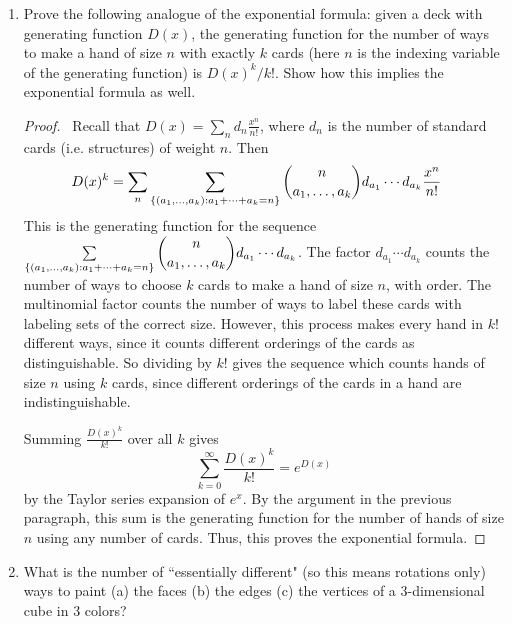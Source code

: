 \documentclass[12pt]{article}
\begin{document}
\begin{enumerate}[leftmargin=0cm,itemindent=.5cm,labelwidth=\itemindent,labelsep=0cm,align=left]
\begin{proof}
Therefore, this process gives a bijection from the set of imperfect matchings on $C_{2n}$, of which there are $L_{2n} - 2$, to the set of subtrees of $W_n$.

\end{proof}

\item Prove the following analogue of the exponential formula: given a deck with generating function $D(x)$, the generating function for the number of ways to make a hand of size $n$ with exactly $k$ cards (here $n$ is the indexing variable of the generating function) is $D(x)^k / k!$.  Show how this implies the exponential formula as well.

\begin{proof}
\ Recall that $D(x) = \sum\limits_n d_n \frac{x^n}{n!}$, where $d_n$ is the number of standard cards (i.e. structures) of weight $n$.  Then
\begin{align*}
D(x)^k &= \sum\limits_n \sum\limits_{\{(a_1, \dots , a_k) : a_1 + \cdots + a_k = n \}} \dbinom{n}{a_1, \dots , a_k}d_{a_1} \cdots d_{a_k} \frac{x^n}{n!}
\end{align*}
This is the generating function for the sequence $\sum\limits_{\{(a_1, \dots , a_k) : a_1 + \cdots + a_k = n \}} \dbinom{n}{a_1, \dots , a_k} d_{a_1} \cdots d_{a_k}$.  The factor $d_{a_1} \cdots d_{a_k}$ counts the number of ways to choose $k$ cards to make a hand of size $n$, with order.   The multinomial factor counts the number of ways to label these cards with labeling sets of the correct size.  However, this process makes every hand in $k!$ different ways, since it counts different orderings of the cards as distinguishable.  So dividing by $k!$ gives the sequence which counts hands of size $n$ using $k$ cards, since different orderings of the cards in a hand are indistinguishable.

Summing $\frac{D(x)^k}{k!}$ over all $k$ gives
$$
\sum\limits_{k=0}^\infty \frac{D(x)^k}{k!} = e^{D(x)}
$$
by the Taylor series expansion of $e^x$.  By the argument in the previous paragraph, this sum is the generating function for the number of hands of size $n$ using any number of cards.  Thus, this proves the exponential formula.
\end{proof}

\item What is the number of ``essentially different" (so this means rotations only) ways to paint (a) the faces (b) the edges (c) the vertices of a 3-dimensional cube in 3 colors?


\end{enumerate}
\end{document}
